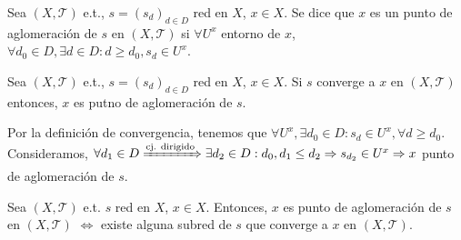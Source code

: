 \begin{defn}[Aglomeración]
  Sea $( X, \mathcal{T} )$ e.t., $s = (s_{d})_{d \in D}$ red en $X$, $x \in X$. Se dice que $x$ es un punto de aglomeración de $s$ en $( X, \mathcal{T} )$ si $\forall U^{x}$ entorno de $x$, $\forall d_{0} \in D, \exists d \in D : d \geq d_{0}, s_{d} \in U^{x}$.
\end{defn}

\begin{prop}
  Sea $( X, \mathcal{T} )$ e.t., $s = (s_{d})_{d \in D}$ red en $X$, $x \in X$. Si $s$ converge a $x$ en $( X, \mathcal{T} )$ entonces, $x$ es putno de aglomeración de $s$.
\end{prop}

\begin{dem}
  Por la definición de convergencia, tenemos que $\forall U^{x}, \exists d_{0} \in D : s_{d} \in U^{x}, \forall d \geq d_{0}$. Consideramos, $\forall d_{1} \in D \xRightarrow[]{ \text{cj. dirigido} } \exists d_{2} \in D : d_{0}, d_{1} \leq d_{2} \Rightarrow s_{d_{2}} \in U^{x} \Rightarrow x$ punto de aglomeración de $s$.
\end{dem}

\begin{prop}
  Sea $( X, \mathcal{T} )$ e.t. $s$ red en $X$, $x \in X$. Entonces, $x$ es punto de aglomeración de $s$ en $( X, \mathcal{T} )$ $\Leftrightarrow$ existe alguna subred de $s$ que converge a $x$ en $( X, \mathcal{T} )$.
\end{prop}

